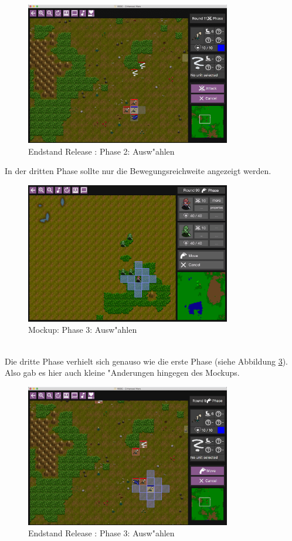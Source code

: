 \documentclass[12pt, titlepage]{scrartcl}
\newcommand{\RN}[1]{%
	\textup{\uppercase\expandafter{\romannumeral#1}}%
}
\newcounter{subsubsubsection}[subsubsection]
\begin{document}
					\begin{figure}[H] 
						\centering
						\includegraphics[width=0.8\textwidth]{images/endOfRelease/Select3.png}
						\caption{Endstand Release \RN{3}: Phase 2: Ausw"ahlen}
						\label{End_Select_2}
					\end{figure}
					In der dritten Phase sollte nur die Bewegungsreichweite angezeigt werden.
					\begin{figure}[H] 
						\centering
						\includegraphics[width=0.8\textwidth]{images/mockups/Select2.png}
						\caption{Mockup: Phase 3: Ausw"ahlen}
						\label{Select_3_2}
					\end{figure}
					\ \\ Die dritte Phase verhielt sich genauso wie die erste Phase (siehe Abbildung \ref{End_Select_3_2}). Also gab es hier auch kleine "Anderungen hingegen des Mockups.
					\begin{figure}[H] 
						\centering
						\includegraphics[width=0.8\textwidth]{images/endOfRelease/Select2.png}
						\caption{Endstand Release \RN{3}: Phase 3: Ausw"ahlen}
						\label{End_Select_3_2}
					\end{figure} 
\end{document}
